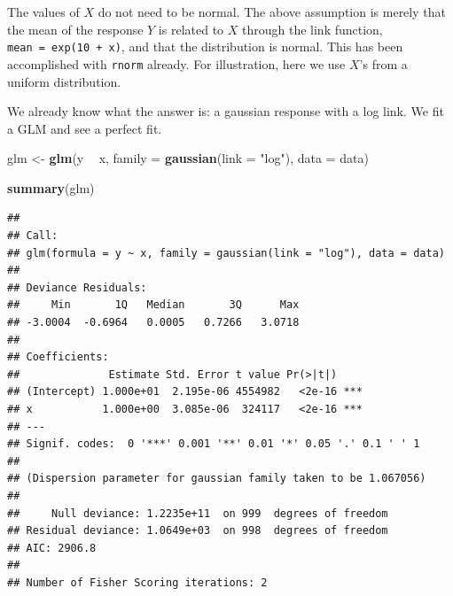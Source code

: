 \documentclass[openany]{book}
\newenvironment{Shaded}{\begin{snugshade}}{\end{snugshade}}
\newcommand{\DataTypeTok}[1]{\textcolor[rgb]{0.13,0.29,0.53}{#1}}
\newcommand{\DecValTok}[1]{\textcolor[rgb]{0.00,0.00,0.81}{#1}}
\newcommand{\KeywordTok}[1]{\textcolor[rgb]{0.13,0.29,0.53}{\textbf{#1}}}
\newcommand{\NormalTok}[1]{#1}
\newcommand{\OperatorTok}[1]{\textcolor[rgb]{0.81,0.36,0.00}{\textbf{#1}}}
\newcommand{\StringTok}[1]{\textcolor[rgb]{0.31,0.60,0.02}{#1}}
\begin{document}
The values of \(X\) do not need to be normal. The above assumption is merely that the mean of the response \(Y\) is related to \(X\) through the link function, \texttt{mean\ =\ exp(10\ +\ x)}, and that the distribution is normal. This has been accomplished with \texttt{rnorm} already. For illustration, here we use \(X\)'s from a uniform distribution.

\begin{Shaded}
\end{Shaded}

We already know what the answer is: a gaussian response with a log link. We fit a GLM and see a perfect fit.

\begin{Shaded}
\begin{Highlighting}[]
\NormalTok{glm <-}\StringTok{ }\KeywordTok{glm}\NormalTok{(y }\OperatorTok{~}\StringTok{ }\NormalTok{x, }\DataTypeTok{family =} \KeywordTok{gaussian}\NormalTok{(}\DataTypeTok{link =} \StringTok{"log"}\NormalTok{), }\DataTypeTok{data =}\NormalTok{ data)}

\KeywordTok{summary}\NormalTok{(glm)}
\end{Highlighting}
\end{Shaded}

\begin{verbatim}
## 
## Call:
## glm(formula = y ~ x, family = gaussian(link = "log"), data = data)
## 
## Deviance Residuals: 
##     Min       1Q   Median       3Q      Max  
## -3.0004  -0.6964   0.0005   0.7266   3.0718  
## 
## Coefficients:
##              Estimate Std. Error t value Pr(>|t|)    
## (Intercept) 1.000e+01  2.195e-06 4554982   <2e-16 ***
## x           1.000e+00  3.085e-06  324117   <2e-16 ***
## ---
## Signif. codes:  0 '***' 0.001 '**' 0.01 '*' 0.05 '.' 0.1 ' ' 1
## 
## (Dispersion parameter for gaussian family taken to be 1.067056)
## 
##     Null deviance: 1.2235e+11  on 999  degrees of freedom
## Residual deviance: 1.0649e+03  on 998  degrees of freedom
## AIC: 2906.8
## 
## Number of Fisher Scoring iterations: 2
\end{verbatim}
\end{document}
